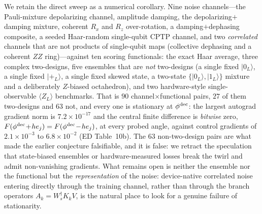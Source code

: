 \documentclass[aps,prxquantum,reprint,superscriptaddress]{revtex4-2}
\newcommand{\ket}[1]{\lvert #1\rangle}
\begin{document}
We retain the direct sweep as a numerical corollary. Nine noise channels---the
Pauli-mixture depolarizing channel, amplitude damping, the
depolarizing$+$damping mixture, coherent $R_x$ and $R_z$ over-rotation, a
damping$+$dephasing composite, a seeded Haar-random single-qubit CPTP channel, and
two \emph{correlated} channels that are not products of single-qubit maps
(collective dephasing and a coherent $ZZ$ ring)---against ten scoring functionals:
the exact Haar average, three complex two-designs, five ensembles that are
\emph{not} two-designs (a single fixed $\ket{0_L}$, a single fixed $\ket{+_L}$, a
single fixed skewed state, a two-state $\{\ket{0_L},\ket{1_L}\}$ mixture and a
deliberately $Z$-biased octahedron), and two hardware-style single-observable
$\langle Z_L\rangle$ benchmarks. That is $90$ channel$\times$functional pairs,
$27$ of them two-designs and $63$ not, and every one is stationary at
$\phi^{\rm dec}$: the largest autograd gradient norm is $7.2\times10^{-17}$ and
the central finite difference is \emph{bitwise} zero,
$F(\phi^{\rm dec}\!+\!he_j)=F(\phi^{\rm dec}\!-\!he_j)$, at every probed angle,
against control gradients of $2.1\times10^{-3}$ to $6.8\times10^{-2}$
(ED Table~10b). The $63$ non-two-design pairs are what made the earlier conjecture
falsifiable, and it is false: we retract the speculation that state-biased
ensembles or hardware-measured losses break the twirl and admit non-vanishing
gradients. What remains open is neither the ensemble nor the functional but the
\emph{representation} of the noise: device-native correlated noise entering
directly through the training channel, rather than through the branch operators
$A_k=W_s^\dagger K_kV$, is the natural place to look for a genuine failure of
stationarity.
\end{document}
